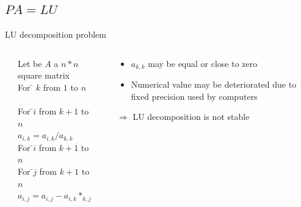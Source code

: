 \subsection{$PA=LU$}
\begin{frame}{LU decomposition problem}
\begin{columns}[c]
\begin{column}{0.02\textwidth}
\end{column}
\begin{column}{0.45\textwidth}
\begin{tabbing}
Let be $A$ a $n*n$ square matrix\\
For \= $k$ from $1$ to $n$\\
\>\\
\> For \=$i$ from $k+1$ to $n$\\
\>\> $a_{i,k} = a_{i,k}/a_{k,k}$\\
\> For \=$i$ from $k+1$ to $n$\\
\>\> For \=$j$ from $k+1$ to $n$\\
\>\>\> $a_{i,j} = a_{i,j}-a_{i,k}*_{k,j}$\\
\end{tabbing}
\end{column}
\begin{column}{0.02\textwidth}
\end{column}
\begin{column}{0.45\textwidth}
\begin{scriptsize}
\begin{itemize}
\item $a_{k,k}$ may be equal or close to zero
\item Numerical value may be deteriorated due to fixed precision used by computers
\end{itemize}
\pause
$\Rightarrow$ LU decomposition is not stable
\end{scriptsize}
\end{column}
\end{columns}
\end{frame}

